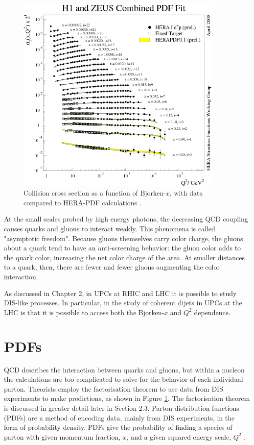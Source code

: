 \begin{figure}[h!]
\begin{centering}
\includegraphics[width=4in]{Chapter1/importfigs/scholarpedia_bjorken_x_qcdExp.png}
\par\end{centering}
\caption{Collision cross section as a function of Bjorken-$x$, with data compared to HERA-PDF calculations \cite{Shimizu:2009fc}. \label{fig:qcdBjorkenX}}
\end{figure}

At the small scales probed by high energy photons, the decreasing QCD coupling causes quarks and gluons to interact weakly. This phenomena is called "asymptotic freedom". Because gluons themselves carry color charge, the gluons about a quark tend to have an anti-screening behavior: the gluon color adds to the quark color, increasing the net color charge of the area. At smaller distances to a quark, then, there are fewer and fewer gluons augmenting the color interaction.

As discussed in Chapter 2, in UPCs at RHIC and LHC it is possible to study DIS-like processes. In particular, in the study of coherent dijets in UPCs at the LHC is that it is possible to access both the Bjorken-$x$ and $Q^2$ dependence.

\section{PDFs}

QCD describes the interaction between quarks and gluons, but within a nucleon the calculations are too complicated to solve for the behavior of each individual parton. Theorists employ the factorisation theorem to use data from DIS experiments to make predictions, as shown in Figure \ref{fig:qcdBjorkenX}. The factorisation theorem is discussed in greater detail later in Section 2.3. Parton distribution functions (PDFs) are a method of encoding data, mainly from DIS experiments, in the form of probability density. PDFs give the probability of finding a species of parton with given momentum fraction, $x$, and a given squared energy scale, $Q^2$ \cite{Martin:2009iq,Eskola:2008ca,Pumplin:2002vw,cmsJpPP}.

